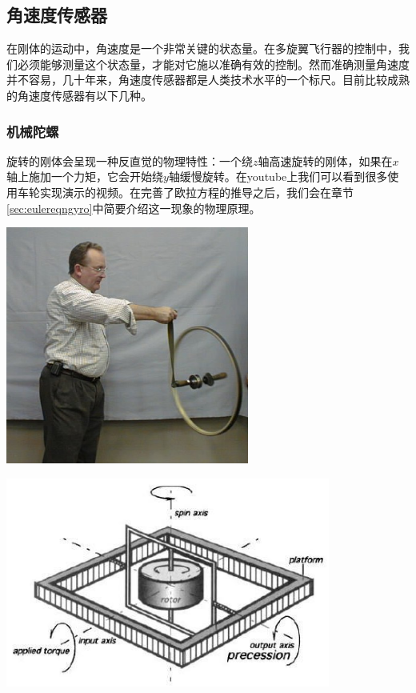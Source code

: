 \documentclass[11pt]{article}
\begin{document}
\subsection{角速度传感器}\label{sec:angularsensor}
在刚体的运动中，角速度是一个非常关键的状态量。在多旋翼飞行器的控制中，我们必须能够测量这个状态量，才能对它施以准确有效的控制。然而准确测量角速度并不容易，几十年来，角速度传感器都是人类技术水平的一个标尺。目前比较成熟的角速度传感器有以下几种。
\subsubsection{机械陀螺}
旋转的刚体会呈现一种反直觉的物理特性：一个绕$z$轴高速旋转的刚体，如果在$x$轴上施加一个力矩，它会开始绕$y$轴缓慢旋转。在youtube上我们可以看到很多使用车轮实现演示的视频。在完善了欧拉方程的推导之后，我们会在章节\ref{sec:eulereqngyro}中简要介绍这一现象的物理原理。

\begin{center}
\includegraphics[width=0.6\textwidth]{images/BicycleWheelGyro.jpg}
\end{center}

\includegraphics[width=0.8\textwidth]{images/gyroscopeAxes.jpg}
\end{document}
